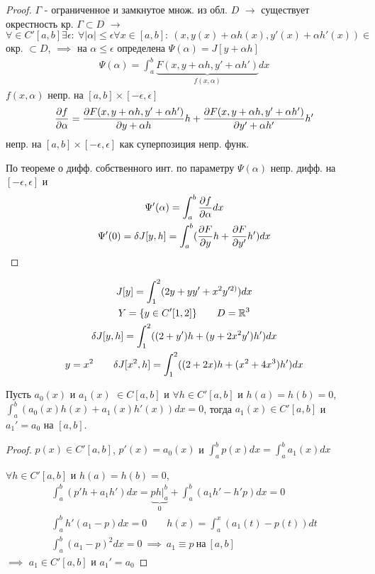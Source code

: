 \documentclass{article}
\begin{document}
\begin{proof}
  $\Gamma$ - ограниченное и замкнутое множ. из обл. $D$
  $\rightarrow$ существует окрестность кр. $\Gamma \subset D$
  $\rightarrow$ $\forall \in C'[a,b] \exists \epsilon : \: \forall |\alpha|\le \epsilon 
  \forall x \in [a,b]: \ (x,y(x)+\alpha h(x), y'(x) + \alpha h'(x)) \in$ окр. $\subset D$,
  $\implies$ на $\alpha \le \epsilon$ определена $\Psi(\alpha)= J[y+ \alpha h]$
  \begin{gather*}
    \Psi(\alpha)=\int_{a}^{b}\underbrace{F(x,y+\alpha h, y' + \alpha h')}_{f(x,\alpha)}dx
  \end{gather*}
  $f(x,\alpha)$ непр. на $[a,b]\times [-\epsilon,\epsilon]$
  \begin{gather*}
    \frac{\partial{f}}{\partial{\alpha}}=\frac{\partial{F(x,y+\alpha h, y'+ \alpha h')}}{\partial{y+\alpha h}}h+\frac{\partial{F(x,y+\alpha h, y'+ \alpha h')}}{\partial{y'+\alpha h'}}h'
  \end{gather*}
  непр. на $[a,b] \times [-\epsilon, \epsilon]$ как суперпозиция непр. функ.

  По теореме о дифф. собственного инт. по параметру $\Psi(\alpha)$ непр. дифф. 
  на $[-\epsilon, \epsilon]$ и 
  \begin{gather*}
    \Psi'(\alpha)=\int_{a}^{b}\frac{\partial{f}}{\partial{\alpha}}dx \\ 
    \Psi'(0)=\delta J[y,h]=\int_{a}^{b}(\frac{\partial{F}}{\partial{y}}h+\frac{\partial{F}}{\partial{y'}}h')dx
  \end{gather*}
\end{proof}
\begin{eg}
  \begin{gather*}
    J[y]=\int_{1}^{2}(2y+yy'+x^{2}y'^{2)})dx \\ 
    Y=\{y \in C'[1,2]\} \qquad D=\mathbb{R}^{3} \\ 
    \delta J[y,h]=\int_{1}^{2}((2+y')h+(y+2x^{2}y')h')dx \\ 
    y=x^{2} \qquad \delta J[x^{2},h]=\int_{1}^{2}((2+2x)h+(x^{2}+4x^{3})h')dx
  \end{gather*}
\end{eg}
\begin{lemma}
  Пусть $a_0(x)$ и $a_1(x)$ $\in C[a,b]$ и $\forall h \in C'[a,b]$ и $h(a)=h(b)=0$, 
  $\int_{a}^{b}(a_0(x)h(x)+a_1(x)h'(x))dx=0$, тогда 
  $a_1(x) \in C'[a,b]$ и $a_1'=a_0$ на $[a,b]$.
\end{lemma}
\begin{proof}
  $p(x) \in C'[a,b]$, $p'(x)=a_0(x)$ и $\int_{a}^{b}p(x)dx=\int_{a}^{b}a_1(x)dx$

  $\forall h \in C'[a,b]$ и $h(a)=h(b)=0$,
  \begin{gather*}
    \int_{a}^{b}(p'h+a_1h')dx=\underbrace{ph\big|_{a}^{b}}_{0}+\int_{a}^{b}(a_1h'-h'p)dx=0 \\ 
    \int_{a}^{b}h'(a_1-p)dx=0 \qquad h(x)=\int_{a}^{x}(a_1(t)-p(t))dt \\ 
    \int_{a}^{b}(a_1-p)^{2}dx=0 \ \implies \ a_1 \equiv p \ \text{на} \ [a,b]
  \end{gather*}
  $\implies$ $a_1 \in C'[a,b]$ и $a_1'=a_0$
\end{proof}
\end{document}

